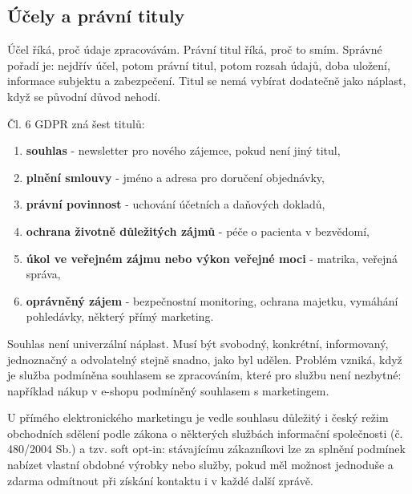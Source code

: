 \subsection*{Účely a právní tituly}
Účel říká, proč údaje zpracovávám. Právní titul říká, proč to smím. Správné pořadí je: nejdřív účel, potom právní titul, potom rozsah údajů, doba uložení, informace subjektu a zabezpečení. Titul se nemá vybírat dodatečně jako náplast, když se původní důvod nehodí.

Čl. 6 GDPR zná šest titulů:
\begin{enumerate}
  \item \textbf{souhlas} - newsletter pro nového zájemce, pokud není jiný titul,
  \item \textbf{plnění smlouvy} - jméno a adresa pro doručení objednávky,
  \item \textbf{právní povinnost} - uchování účetních a daňových dokladů,
  \item \textbf{ochrana životně důležitých zájmů} - péče o pacienta v bezvědomí,
  \item \textbf{úkol ve veřejném zájmu nebo výkon veřejné moci} - matrika, veřejná správa,
  \item \textbf{oprávněný zájem} - bezpečnostní monitoring, ochrana majetku, vymáhání pohledávky, některý přímý marketing.
\end{enumerate}

Souhlas není univerzální náplast. Musí být svobodný, konkrétní, informovaný, jednoznačný a odvolatelný stejně snadno, jako byl udělen. Problém vzniká, když je služba podmíněna souhlasem se zpracováním, které pro službu není nezbytné: například nákup v e-shopu podmíněný souhlasem s marketingem.

U přímého elektronického marketingu je vedle souhlasu důležitý i český režim obchodních sdělení podle zákona o některých službách informační společnosti (č. 480/2004 Sb.) a tzv. soft opt-in: stávajícímu zákazníkovi lze za splnění podmínek nabízet vlastní obdobné výrobky nebo služby, pokud měl možnost jednoduše a zdarma odmítnout při získání kontaktu i v každé další zprávě.

